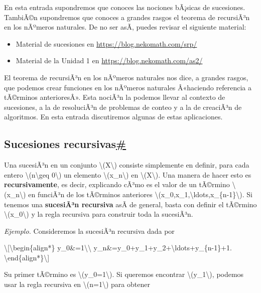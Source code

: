 En esta entrada supondremos que conoces las nociones bÃ¡sicas de
sucesiones. TambiÃ©n supondremos que conoces a grandes rasgos el teorema
de recursiÃ³n en los nÃºmeros naturales. De no ser asÃ­, puedes revisar
el siguiente material:

\begin{itemize}
\item
  Material de sucesiones en \url{https://blog.nekomath.com/srp/}
\item
  Material de la Unidad 1 en \url{https://blog.nekomath.com/as2/}
\end{itemize}

El teorema de recursiÃ³n en los nÃºmeros naturales nos dice, a grandes
rasgos, que podemos crear funciones en los nÃºmeros naturales Â«haciendo
referencia a tÃ©rminos anterioresÂ». Esta nociÃ³n la podemos llevar al
contexto de sucesiones, a la de resoluciÃ³n de problemas de conteo y a
la de creaciÃ³n de algoritmos. En esta entrada discutiremos algunas de
estas aplicaciones.

\subsection{\texorpdfstring{Sucesiones
recursivas\hyperref[sucesiones-recursivas]{\#}}{Sucesiones recursivas\#}}\label{sucesiones-recursivas}

Una sucesiÃ³n en un conjunto {\textbackslash(X\textbackslash)} consiste
simplemente en definir, para cada entero
{\textbackslash(n\textbackslash geq 0\textbackslash)} un elemento
{\textbackslash(x\_n\textbackslash)} en
{\textbackslash(X\textbackslash)}. Una manera de hacer esto es
\textbf{recursivamente}, es decir, explicando cÃ³mo es el valor de un
tÃ©rmino {\textbackslash(x\_n\textbackslash)} en funciÃ³n de los
tÃ©rminos anteriores
{\textbackslash(x\_0,x\_1,\textbackslash ldots,x\_\{n-1\}\textbackslash)}.
Si tenemos una \textbf{sucesiÃ³n recursiva} asÃ­ de general, basta con
definir el tÃ©rmino {\textbackslash(x\_0\textbackslash)} y la regla
recursiva para construir toda la sucesiÃ³n.

\emph{Ejemplo.} Consideremos la sucesiÃ³n recursiva dada por

\textbackslash{[}\textbackslash begin\{align*\}
y\_0\&=1\textbackslash\textbackslash{}
y\_n\&=y\_0+y\_1+y\_2+\textbackslash ldots+y\_\{n-1\}+1.
\textbackslash end\{align*\}\textbackslash{]}

Su primer tÃ©rmino es {\textbackslash(y\_0=1\textbackslash)}. Si
queremos encontrar {\textbackslash(y\_1\textbackslash)}, podemos usar la
regla recursiva en {\textbackslash(n=1\textbackslash)} para obtener

